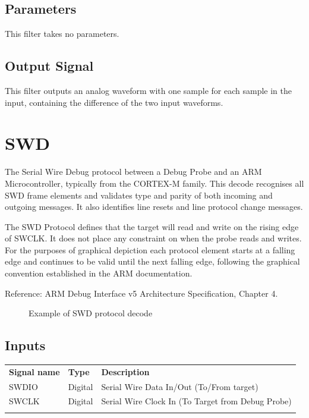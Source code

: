 \subsection{Parameters}

This filter takes no parameters.

\subsection{Output Signal}

This filter outputs an analog waveform with one sample for each sample in the input, containing the difference of the
two input waveforms.

\pagebreak
\section{SWD}

The Serial Wire Debug protocol between a Debug Probe and an ARM Microcontroller, typically from the CORTEX-M family. This
decode recognises all SWD frame elements and validates type and parity of both incoming and outgoing messages. It also
identifies line resets and line protocol change messages.

The SWD Protocol defines that the target will read and write on the rising edge of SWCLK. It does not place any constraint
on when the probe reads and writes. For the purposes of graphical depiction each protocol element starts at a falling edge
and continues to be valid until the next falling edge, following the graphical convention established in the ARM documentation.

Reference: ARM Debug Interface v5 Architecture Specification, Chapter 4.

\begin{figure}[h]
\centering
{}
\caption{Example of SWD protocol decode}
\label{swd_example}
\end{figure}

\subsection{Inputs}

\begin{tabularx}{16cm}{llX}
\thickhline
\textbf{Signal name} & \textbf{Type} & \textbf{Description} \\
\thickhline
SWDIO & Digital & Serial Wire Data In/Out (To/From target)\\
SWCLK & Digital & Serial Wire Clock In (To Target from Debug Probe)\\
\thickhline
\end{tabularx}

